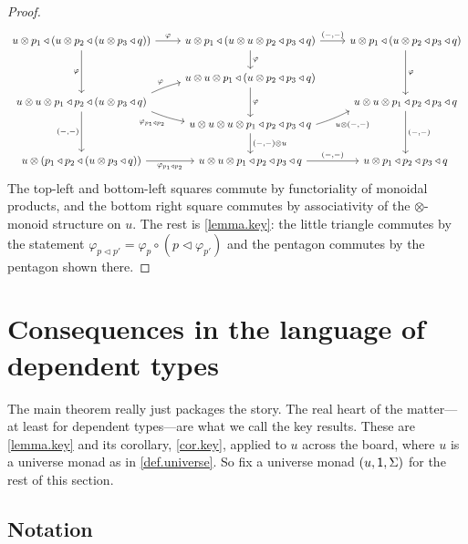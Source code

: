\documentclass[11pt, one side, article]{memoir}
\theoremstyle{definition}
\theoremstyle{plain}
\newcommand{\0}{\textsf{0}}
\newcommand{\1}{\tn{\textsf{1}}}
\newcommand{\tri}{\mathbin{\triangleleft}}
\begin{document}
\begin{proof}
\[\fontsize{9.6pt}{9.6pt}\selectfont
\begin{tikzcd}
	u\otimes p_1\tri(u\otimes p_2\tri(u\otimes p_3\tri q))\ar[r, "\varphi"]\ar[dd, "\varphi"']&
	u\otimes p_1\tri(u\otimes u\otimes p_2\tri p_3\tri q)\ar[r, "{(-,-)}"]\ar[d, "\varphi"]&
	u\otimes p_1\tri(u\otimes p_2\tri p_3\tri q)\ar[dd, "\varphi"]\\&
	u\otimes u\otimes p_1\tri(u\otimes p_2\tri p_3\tri q)\ar[dd, "\varphi"]\\[-12pt]
	u\otimes u\otimes p_1\tri p_2\tri(u\otimes p_3\tri q)\ar[dd, "{(-,-)}"']\ar[ur, bend left=5pt, start anchor={north east}, "\varphi"]\ar[dr, bend right=5pt, start anchor={south east}, "\varphi_{p_1\tri p_2}"']&&
	u\otimes u\otimes p_1\tri p_2\tri p_3\tri q\ar[dd, "{(-,-)}"]\\[-12pt]&
	u\otimes u\otimes u\otimes p_1\tri p_2\tri p_3\tri q\ar[d, "{(-,-)}\otimes u"]\ar[ur, bend right=5pt, start anchor={east}, end anchor={south west}, "u\otimes{(-,-)}"']\\
	u\otimes(p_1\tri p_2\tri(u\otimes p_3\tri q))\ar[r, "\varphi_{p_1\tri p_2}"']&
	u\otimes u\otimes p_1\tri p_2\tri p_3\tri q\ar[r, "{(-,-)}"]&
	u\otimes p_1\tri p_2\tri p_3\tri q
\end{tikzcd}
\]
The top-left and bottom-left squares commute by functoriality of monoidal products, and the bottom right square commutes by associativity of the $\otimes$-monoid structure on $u$. The rest is \cref{lemma.key}: the little triangle commutes by the statement $\varphi_{p\tri p'}=\varphi_{p}\circ (p\tri\varphi_{p'})$ and the pentagon commutes by the pentagon shown there.
\end{proof}

\chapter{Consequences in the language of dependent types}

The main theorem really just packages the story. The real heart of the matter---at least for dependent types---are what we call the key results. These are \cref{lemma.key} and its corollary, \cref{cor.key}, applied to $u$ across the board, where $u$ is a universe monad as in \cref{def.universe}. So fix a universe monad $(u,\1,\Sigma)$ for the rest of this section.

\section{Notation}
\end{document}
